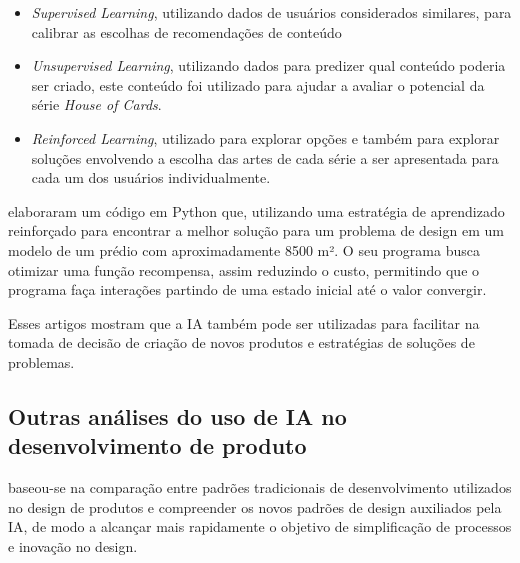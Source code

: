 \begin{itemize}
    \item \textit{Supervised Learning},
    utilizando dados de usuários considerados similares, para calibrar as escolhas de recomendações de conteúdo
    
    \item \textit{Unsupervised Learning},
    utilizando dados para predizer qual conteúdo poderia ser criado, este conteúdo foi utilizado para ajudar a avaliar o potencial da série \textit{House of Cards}.

    \item \textit{Reinforced Learning},
    utilizado para explorar opções e também para explorar soluções envolvendo a escolha das artes de cada série a ser apresentada para cada um dos usuários individualmente.
\end{itemize}


 elaboraram um código em Python que, utilizando uma estratégia de aprendizado reinforçado para encontrar a melhor solução para um problema de design em um modelo de um prédio com aproximadamente 8500 m². O seu programa busca otimizar uma função recompensa, assim reduzindo o custo, permitindo que o programa faça interações partindo de uma estado inicial até o valor convergir.


Esses artigos mostram que a IA também pode ser utilizadas para facilitar na tomada de decisão de criação de novos produtos e estratégias de soluções de problemas.

\subsection*{Outras análises do uso de IA no desenvolvimento de produto}

 baseou-se na comparação entre padrões tradicionais de desenvolvimento utilizados no design de produtos e compreender os novos padrões de design auxiliados pela IA, de modo a alcançar mais rapidamente o objetivo de simplificação de processos e inovação no design.

